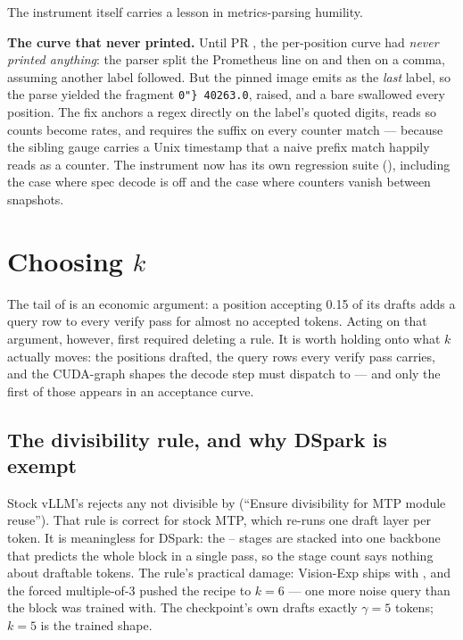 The instrument itself carries a lesson in metrics-parsing humility.

\begin{hbwarstory}
\textbf{The curve that never printed.} Until PR , the
per-position curve had \emph{never printed anything}: the parser split the
Prometheus line on  and then on a comma, assuming another
label followed. But the pinned image emits  as the
\emph{last} label, so the parse yielded the fragment \texttt{0"\}~40263.0},
 raised, and a bare  swallowed every position. The
fix anchors a regex directly on the  label's quoted digits,
reads  so counts become rates, and requires the
 suffix on every counter match --- because the sibling 
gauge carries a Unix timestamp that a naive prefix match happily reads as a
counter. The instrument now has its own regression suite
(), including the case where spec
decode is off and the case where counters vanish between snapshots.
\end{hbwarstory}

\section{Choosing \texorpdfstring{$k$}{k}}
\label{sec:specdecode-choosing-k}

The tail of  is an economic argument: a position
accepting 0.15 of its drafts adds a query row to every verify pass for
almost no accepted tokens. Acting on that argument, however, first required
deleting a rule. It is worth holding onto what $k$ actually moves: the
positions drafted, the query rows every verify pass carries, and the
CUDA-graph shapes the decode step must dispatch to --- and only the first of
those appears in an acceptance curve.

\subsection{The divisibility rule, and why DSpark is exempt}

Stock vLLM's  rejects any
 not divisible by 
(``Ensure divisibility for MTP module reuse''). That rule is correct for
stock MTP, which re-runs one draft layer per token. It is meaningless for
DSpark: the -- stages are stacked into one backbone that
predicts the whole  block in a single pass, so the
stage count says nothing about draftable tokens. The rule's practical damage:
Vision-Exp ships  with
, and the forced multiple-of-3 pushed the recipe to
$k{=}6$ --- one more noise query than the block was trained with. The
checkpoint's own   drafts
exactly $\gamma{=}5$ tokens; $k{=}5$ is the trained shape.

